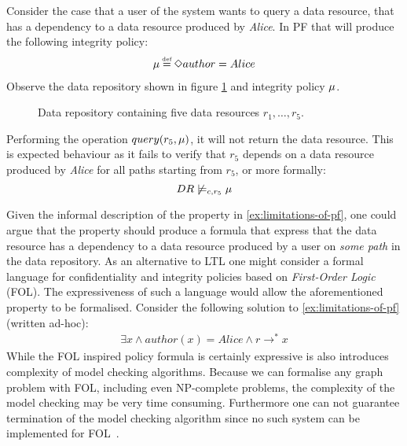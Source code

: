 \begin{example}\label{ex:limitations-of-pf}
Consider the case that a user of the system wants to query a data resource, that has a dependency to a data resource produced by \emph{Alice}. In PF that will produce the following integrity policy:
\begin{align*}
    \inte \eqdef \F author = Alice
\end{align*}
Observe the data repository shown in figure \ref{fig:pf-limitations} and integrity policy $\mu$.
\begin{figure}[!ht]
    \centering
    
    \caption{Data repository containing five data resources $r_1,\ldots,r_5$.}
    \label{fig:pf-limitations}
\end{figure}
Performing the operation $query(r_5, \mu)$, it will not return the data resource. This is expected behaviour as it fails to verify that $r_5$ depends on a data resource produced by \emph{Alice} for all paths starting from $r_5$, or more formally:
\begin{equation*}
    DR \not\models_{c,r_5} \mu
\end{equation*}
\end{example}
Given the informal description of the property in \autoref{ex:limitations-of-pf}, one could argue that the property should produce a formula that express that the data resource has a dependency to a data resource produced by a user on \emph{some path} in the data repository. As an alternative to LTL one might consider a formal language for confidentiality and integrity policies based on \emph{First-Order Logic} (FOL). The expressiveness of such a language would allow the aforementioned property to be formalised. Consider the following solution to \autoref{ex:limitations-of-pf} (written ad-hoc):
\begin{align*}
    \exists x \land author(x) = Alice \land r \longrightarrow^\ast x
\end{align*}
While the FOL inspired policy formula is certainly expressive is also introduces complexity of model checking algorithms. Because we can formalise any graph problem with FOL, including even NP-complete problems, the complexity of the model checking may be very time consuming. Furthermore one can not guarantee termination of the model checking algorithm since no such system can be implemented for FOL~\cite{church1936note}.

